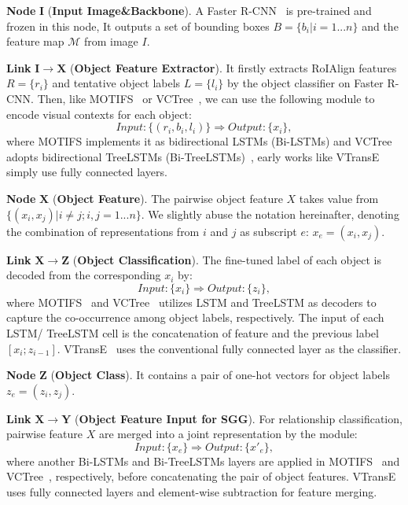 \documentclass[10pt,twocolumn,letterpaper]{article}
\begin{document}
\noindent\textbf{Node} $\bm{I}$ (\textbf{Input Image\&Backbone}). A Faster R-CNN~\cite{ren2015faster} is pre-trained and frozen in this node, It outputs a set of bounding boxes $B=\{b_i|i=1...n\}$ and the feature map $\mathcal{M}$ from image $I$.

\noindent\textbf{Link} $\bm{I\to X}$ (\textbf{Object Feature Extractor}). It firstly extracts RoIAlign features~\cite{he2017mask} $R=\{r_i\}$ and tentative object labels $L=\{l_i\}$ by the object classifier on Faster R-CNN. Then, like MOTIFS~\cite{zellers2018neural} or VCTree~\cite{tang2019learning}, we can use the following module to encode visual contexts for each object:
\begin{equation}
    \textit{Input}: \{(r_i, b_i, l_i)\} \Longrightarrow \textit{Output}: \{x_i\},
    \label{module:1}
\end{equation}
where MOTIFS implements it as bidirectional LSTMs (Bi-LSTMs) and VCTree~\cite{tang2019learning} adopts bidirectional TreeLSTMs (Bi-TreeLSTMs)~\cite{tai2015improved}, early works like VTransE~\cite{zhang2017visual} simply use fully connected layers. 

\noindent\textbf{Node} $\bm{X}$ (\textbf{Object Feature}). The pairwise object feature $X$ takes value from $\{(x_i, x_j)|i\neq j;i,j=1...n\}$. We slightly abuse the notation hereinafter, denoting the combination of representations from $i$ and $j$ as subscript $e$: $x_{e}=(x_i,x_j)$.


\noindent\textbf{Link} $\bm{X\to Z}$ (\textbf{Object Classification}). The fine-tuned label of each object is decoded from the corresponding $x_i$ by: 
\begin{equation}
    \textit{Input}: \{x_i\} \Longrightarrow \textit{Output}: \{z_i\},
    \label{module:2}
\end{equation}
where MOTIFS~\cite{zellers2018neural} and VCTree~\cite{tang2019learning} utilizes LSTM and TreeLSTM as decoders to capture the co-occurrence among object labels, respectively. The input of each LSTM/ TreeLSTM cell is the concatenation of feature and the previous label $[x_i;z_{i-1}]$. VTransE~\cite{zhang2017visual} uses the conventional fully connected layer as the classifier.

\noindent\textbf{Node} $\bm{Z}$ (\textbf{Object Class}). It contains a pair of one-hot vectors for object labels $z_{e}=(z_i, z_j)$.

\noindent\textbf{Link} $\bm{X\to Y}$ (\textbf{Object Feature Input for SGG}). For relationship classification, pairwise feature $X$ are merged into a joint representation by the module:
\begin{equation}
    \textit{Input}: \{x_{e}\} \Longrightarrow \textit{Output}: \{x'_{e}\},
    \label{module:3}
\end{equation}
where another Bi-LSTMs and Bi-TreeLSTMs layers are applied in MOTIFS~\cite{zellers2018neural} and VCTree~\cite{tang2019learning}, respectively, before concatenating the pair of object features. VTransE~\cite{zhang2017visual} uses fully connected layers and element-wise subtraction for feature merging.
\end{document}
